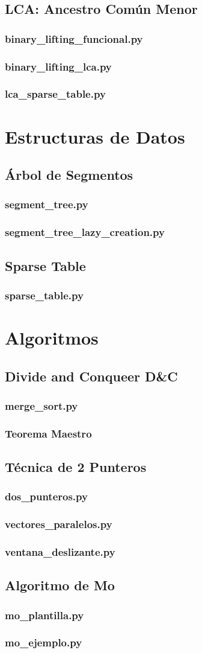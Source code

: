 \documentclass{article}
\newcommand\codefile[2]{    
    \subsubsection{#2}
    
    
}
\begin{document}
\begin{multicols*}{2}
\subsection{LCA: Ancestro Común Menor}
\codefile{grafos/binary_lifting_funcional.py}{binary\_lifting\_funcional.py}
\codefile{grafos/binary_lifting_lca.py}{binary\_lifting\_lca.py}
\codefile{grafos/lca_sparse_table.py}{lca\_sparse\_table.py}

\section{Estructuras de Datos}

\subsection{Árbol de Segmentos}
\codefile{estructuras\_de\_datos/segment\_tree.py}{segment\_tree.py}
\codefile{estructuras\_de\_datos/segment\_tree\_lazy\_creation.py}{segment\_tree\_lazy\_creation.py}

\subsection{Sparse Table}
\codefile{estructuras\_de\_datos/sparse\_table.py}{sparse\_table.py}

\section{Algoritmos}

\subsection{Divide and Conqueer D\&C}
\codefile{algoritmos/mergesort.py}{merge\_sort.py}
\subsubsection{Teorema Maestro}


\subsection{Técnica de 2 Punteros}
\codefile{algoritmos/dos_punteros.py}{dos\_punteros.py}
\codefile{algoritmos/vectores_paralelos.py}{vectores\_paralelos.py}
\codefile{algoritmos/ventana_deslizante.py}{ventana\_deslizante.py} 

\subsection{Algoritmo de Mo}
\codefile{algoritmos/mo_plantilla.py}{mo\_plantilla.py}
\codefile{algoritmos/mo_ejemplo.py}{mo\_ejemplo.py}


\end{multicols*}
\end{document}
